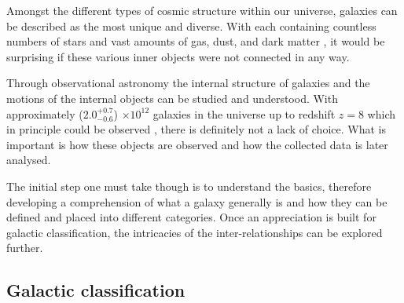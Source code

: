 \documentclass[12pt, twocolumn]{revtex4-1}    %
\begin{document}
\twocolumngrid


Amongst the different types of cosmic structure within our universe, galaxies can be described as the most unique and diverse. With each containing countless numbers of stars and vast amounts of gas, dust, and dark matter \citep{carroll_astro}, it would be surprising if these various inner objects were not connected in any way.

Through observational astronomy the internal structure of galaxies and the motions of the internal objects can be studied and understood. With approximately ($2.0^{+0.7}_{-0.6}$) $\times 10^{12}$ galaxies in the universe up to redshift $z=8$ which in principle could be observed \citep{conselice_galaxynumber}, there is definitely not a lack of choice. What is important is how these objects are observed and how the collected data is later analysed. 




The initial step one must take though is to understand the basics, therefore developing a comprehension of what a galaxy generally is and how they can be defined and placed into different categories. Once an appreciation is built for galactic classification, the intricacies of the inter-relationships can be explored further. 


\subsection{Galactic classification}
\end{document}
